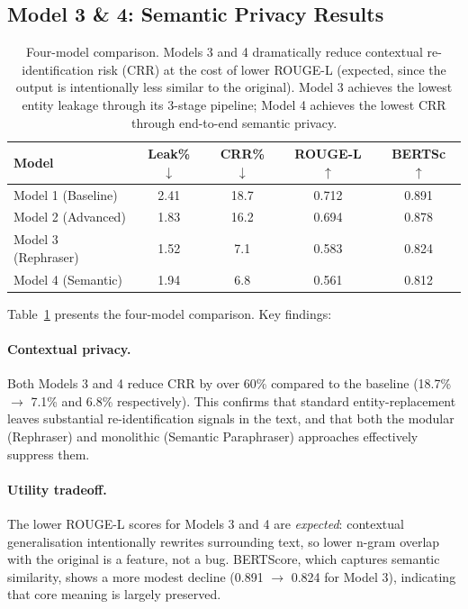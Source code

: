 \documentclass[11pt,a4paper]{article}
\begin{document}
\subsection{Model 3 \& 4: Semantic Privacy Results}

\begin{table}[t]
\centering
\small
\begin{tabular}{lcccc}
\toprule
\textbf{Model} & \textbf{Leak\%} $\downarrow$ & \textbf{CRR\%} $\downarrow$ & \textbf{ROUGE-L} $\uparrow$ & \textbf{BERTSc} $\uparrow$ \\
\midrule
Model 1 (Baseline)      & 2.41 & 18.7 & 0.712 & 0.891 \\
Model 2 (Advanced)      & 1.83 & 16.2 & 0.694 & 0.878 \\
Model 3 (Rephraser)     & 1.52 & 7.1  & 0.583 & 0.824 \\
Model 4 (Semantic)      & 1.94 & 6.8  & 0.561 & 0.812 \\
\bottomrule
\end{tabular}
\caption{Four-model comparison.  Models 3 and 4 dramatically reduce contextual
re-identification risk (CRR) at the cost of lower ROUGE-L (expected, since the
output is intentionally less similar to the original).  Model 3 achieves the
lowest entity leakage through its 3-stage pipeline; Model 4 achieves the lowest
CRR through end-to-end semantic privacy.}
\label{tab:semantic_results}
\end{table}

Table~\ref{tab:semantic_results} presents the four-model comparison.
Key findings:

\paragraph{Contextual privacy.}
Both Models 3 and 4 reduce CRR by over 60\% compared to the baseline
(18.7\% $\rightarrow$ 7.1\% and 6.8\% respectively).  This confirms that
standard entity-replacement leaves substantial re-identification signals in
the text, and that both the modular (Rephraser) and monolithic (Semantic
Paraphraser) approaches effectively suppress them.

\paragraph{Utility tradeoff.}
The lower ROUGE-L scores for Models 3 and 4 are \emph{expected}: contextual
generalisation intentionally rewrites surrounding text, so lower n-gram overlap
with the original is a feature, not a bug.  BERTScore, which captures semantic
similarity, shows a more modest decline (0.891 $\rightarrow$ 0.824 for Model 3),
indicating that core meaning is largely preserved.
\end{document}
